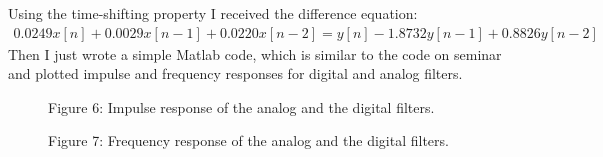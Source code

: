 \documentclass[16pt]{report}
\begin{document}
Using the time-shifting property I received the difference equation:
\begin{gather*}
    0.0249x[n]+0.0029x[n-1]+0.0220x[n-2] = y[n]-1.8732y[n-1]+0.8826y[n-2] 
\end{gather*}
Then I just wrote a simple Matlab code, which is similar to the code on seminar and plotted impulse and frequency responses for digital and analog filters.
\begin{figure}
    \begin{minipage}[h]{1\linewidth}
    \caption{Figure 6: Impulse response of the analog and the digital filters.}
    \label{fig:my_label}
    \end{minipage}
    \vfill
    \begin{minipage}[h]{1\linewidth}
    \caption{Figure 7: Frequency response of the analog and the digital filters.}
    \label{fig:my_label}
    \end{minipage}
\end{figure}
\newpage
\end{document}
